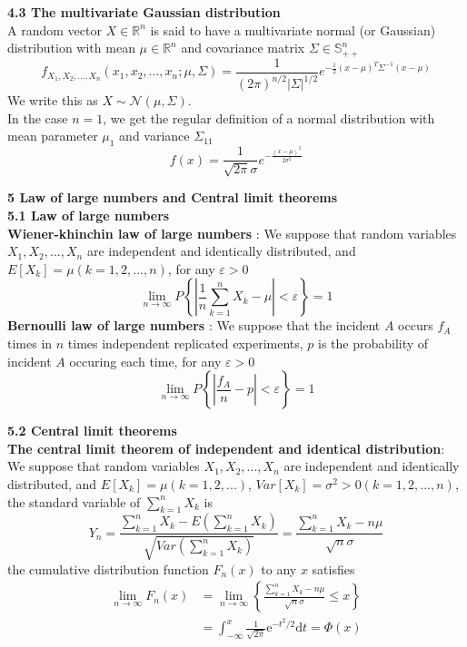 \documentclass[10pt,a4paper,oneside]{beamer}
\begin{document}
\begin{frame}
\vspace{0.3cm}
{\bfseries 4.3 The multivariate Gaussian distribution}
\vspace{0.3cm}
\\A random vector $X\in\mathbb{R}^n$ is said to have a multivariate normal (or Gaussian) distribution with mean $\mu\in\mathbb{R}^n$ and covariance matrix $\Sigma\in\mathbb{S}^n_{++}$
\[
f_{X_{1}, X_{2}, \ldots, X_{n}}\left(x_{1}, x_{2}, \ldots, x_{n} ; \mu, \Sigma\right)=\frac{1}{(2 \pi)^{n / 2}|\Sigma|^{1 / 2}} e^{ -\frac{1}{2}(x-\mu)^{T} \Sigma^{-1}(x-\mu)}
\]
We write this as $X \sim \mathcal{N}(\mu, \Sigma)$.
\vspace{0.3cm}
\\In the case $n=1$, we get the regular definition of a normal distribution with mean parameter $\mu_1$ and variance $\Sigma_{11}$
\[
f(x)=\frac{1}{\sqrt{2 \pi} \sigma} e^{-\frac{(x-\mu)^{2}}{2 \sigma^{2}}}
\]
\end{frame}
\begin{frame}
\vspace{0.3cm}
{\bfseries 5 Law of large numbers and Central limit theorems} 
\vspace{0.3cm}
\\{\bfseries 5.1 Law of large numbers}
\vspace{0.2cm}
\\{\bfseries Wiener-khinchin law of large numbers }: We suppose that random variables $X_1,X_2,...,X_n$ are independent and identically distributed, and  $E[X_k]=\mu(k=1,2,...,n)$, for any $\varepsilon>0$
\[
\lim _{n \rightarrow \infty} P\left\{\left|\frac{1}{n} \sum_{k=1}^{n} X_{k}-\mu\right|<\varepsilon\right\}=1
\]
{\bfseries Bernoulli law of large numbers }: We suppose that the incident $A$ occurs $f_A$ times in $n$ times independent replicated experiments, $p$ is the probability of incident $A$ occuring each time, for any $\varepsilon>0$
\[
\lim _{n \rightarrow \infty} P\left\{\left|\frac{f_{A}}{n}-p\right|<\varepsilon\right\}=1
\]
\end{frame}
\begin{frame}
\vspace{0.3cm}
{\bfseries 5.2 Central limit theorems}
\vspace{0.2cm}
\\{\bfseries The central limit theorem of independent and identical distribution}: We suppose that random variables $X_1,X_2,...,X_n$ are independent and identically distributed, and  $E[X_k]=\mu(k=1,2,...)$, $Var[X_k]=\sigma^2>0(k=1,2,...,n)$, the standard variable of  $\sum_{k=1}^{n}X_k$ is
\[
Y_{n}=\frac{\sum_{k=1}^{n} X_{k}-E\left(\sum_{k=1}^{n} X_{k}\right)}{\sqrt{Var\left(\sum_{k=1}^{n} X_{k}\right)}}=\frac{\sum_{k=1}^{n} X_{k}-n \mu}{\sqrt{n} \sigma}
\]
the cumulative distribution function $F_n(x)$ to any $x$ satisfies
\[
\begin{aligned} \lim _{n \rightarrow \infty} F_{n}(x) &=\lim _{n \rightarrow \infty}\left\{\frac{\sum_{k=1}^{n} X_{k}-n \mu}{\sqrt{n} \sigma} \leqslant x\right\} \\ &=\int_{-\infty}^{x} \frac{1}{\sqrt{2 \pi}} \mathrm{e}^{-t^{2} / 2} \mathrm{d} t=\Phi(x) \end{aligned}
\]
\end{frame}
\end{document}
